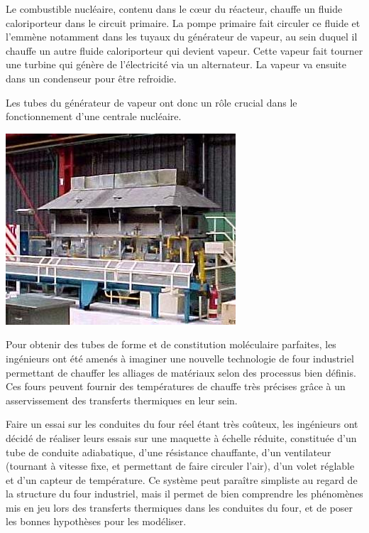 Le combustible nucléaire, contenu dans le c\oe ur du réacteur, chauffe un fluide caloriporteur dans le circuit primaire. La pompe primaire fait circuler ce fluide et l'emmène notamment dans les tuyaux du générateur de vapeur, au sein duquel il chauffe un autre fluide caloriporteur qui devient vapeur. Cette vapeur fait tourner une turbine qui génère de l'électricité via un alternateur. La vapeur va ensuite dans un condenseur pour être refroidie.

Les tubes du générateur de vapeur ont donc un rôle crucial dans le fonctionnement d'une centrale nucléaire.

\vfill

\begin{minipage}{0.4\linewidth}
 \includegraphics[width=0.8\linewidth]{img/fig4}
\end{minipage}
\hfill
\begin{minipage}{0.57\linewidth}
Pour obtenir des tubes de forme et de constitution moléculaire parfaites, les ingénieurs ont été amenés à imaginer une nouvelle technologie de four industriel permettant de chauffer les alliages de matériaux selon des processus bien définis. Ces fours peuvent fournir des températures de chauffe très précises grâce à un asservissement des transferts thermiques en leur sein.
\end{minipage}

\vfill

Faire un essai sur les conduites du four réel étant très coûteux, les ingénieurs ont décidé de réaliser leurs essais sur une maquette à échelle réduite, constituée d'un tube de conduite adiabatique, d'une résistance chauffante, d'un ventilateur (tournant à vitesse fixe, et permettant de faire circuler l'air), d'un volet réglable et d'un capteur de température. Ce système peut paraître simpliste au regard de la structure du four industriel, mais il permet de bien comprendre les phénomènes mis en jeu lors des transferts thermiques dans les conduites du four, et de poser les bonnes hypothèses pour les modéliser.

